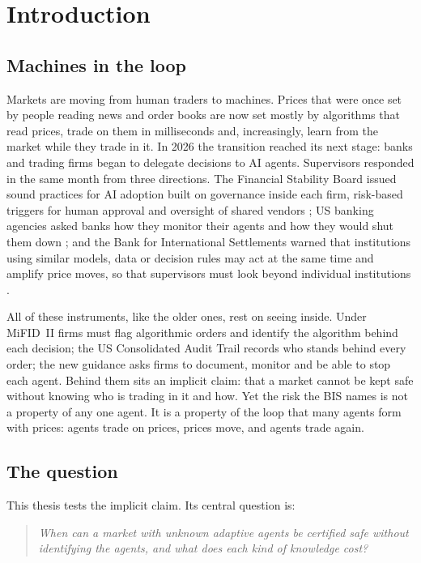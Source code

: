 \chapter{Introduction}\label{ch:intro}

\section{Machines in the loop}

Markets are moving from human traders to machines. Prices that were once set by people reading news and order books are now set mostly by algorithms that read prices, trade on them in milliseconds and, increasingly, learn from the market while they trade in it. In 2026 the transition reached its next stage: banks and trading firms began to delegate decisions to AI agents. Supervisors responded in the same month from three directions. The Financial Stability Board issued sound practices for AI adoption built on governance inside each firm, risk-based triggers for human approval and oversight of shared vendors \citep{t:fsb2026}; US banking agencies asked banks how they monitor their agents and how they would shut them down \citep{t:reuters2026}; and the Bank for International Settlements warned that institutions using similar models, data or decision rules may act at the same time and amplify price moves, so that supervisors must look beyond individual institutions \citep{t:bis2026}.

All of these instruments, like the older ones, rest on seeing inside. Under MiFID~II firms must flag algorithmic orders and identify the algorithm behind each decision; the US Consolidated Audit Trail records who stands behind every order; the new guidance asks firms to document, monitor and be able to stop each agent. Behind them sits an implicit claim: that a market cannot be kept safe without knowing who is trading in it and how. Yet the risk the BIS names is not a property of any one agent. It is a property of the loop that many agents form with prices: agents trade on prices, prices move, and agents trade again.

\section{The question}

This thesis tests the implicit claim. Its central question is:
\begin{quote}
\emph{When can a market with unknown adaptive agents be certified safe without identifying the agents, and what does each kind of knowledge cost?}
\end{quote}

